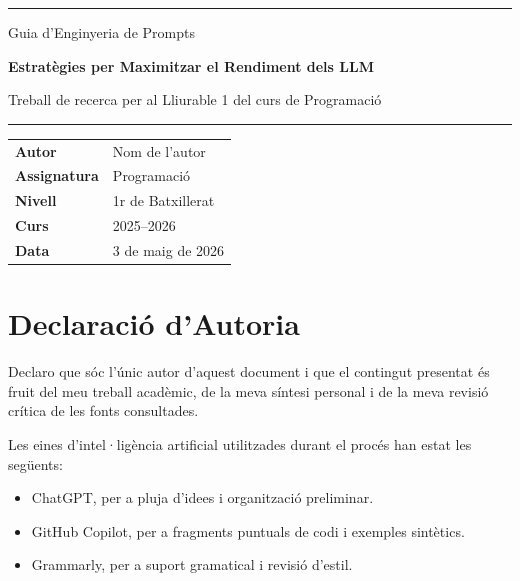 \documentclass[12pt,a4paper]{report}
\newcommand{\nomautor}{Nom de l'autor}
\begin{document}
\hypersetup{pageanchor=false}

\begin{titlepage}
  \thispagestyle{empty}
  \textcolor{blue}{\rule{\textwidth}{1.2pt}}

  \vspace{2.2cm}

  \begin{center}
    {\Large Guia d'Enginyeria de Prompts\par}
    \vspace{0.6cm}
    {\Huge\bfseries Estratègies per Maximitzar el Rendiment dels LLM\par}
    \vspace{0.8cm}
    {\large Treball de recerca per al Lliurable 1 del curs de Programació\par}
  \end{center}

  \vspace{1cm}
  \textcolor{blue}{\rule{\textwidth}{0.6pt}}

  \vspace{1.2cm}

  \begin{tabularx}{\textwidth}{>{\bfseries}l X}
    Autor & \nomautor \\
    Assignatura & Programació \\
    Nivell & 1r de Batxillerat \\
    Curs & 2025--2026 \\
    Data & 3 de maig de 2026 \\
  \end{tabularx}

  \vfill

  \begin{center}
  \end{center}
\end{titlepage}

\clearpage
\section*{Declaració d'Autoria}
\thispagestyle{empty}
Declaro que sóc l'únic autor d'aquest document i que el contingut presentat és fruit del meu treball acadèmic, de la meva síntesi personal i de la meva revisió crítica de les fonts consultades.

Les eines d'intel·ligència artificial utilitzades durant el procés han estat les següents:
\begin{itemize}[leftmargin=1.5cm]
  \item ChatGPT, per a pluja d'idees i organització preliminar.
  \item GitHub Copilot, per a fragments puntuals de codi i exemples sintètics.
  \item Grammarly, per a suport gramatical i revisió d'estil.
\end{itemize}
\end{document}
